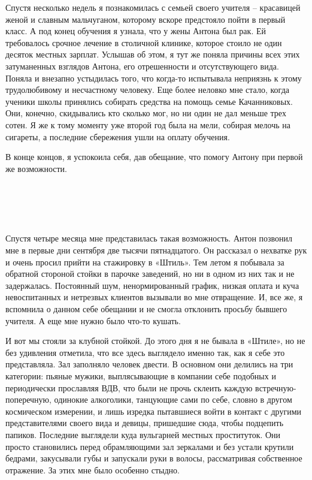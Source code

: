 \documentclass[
]{book}
\begin{document}
Спустя несколько недель я познакомилась с семьей своего учителя -- красавицей женой и славным мальчуганом, которому вскоре предстояло пойти в первый класс. А под конец обучения я узнала, что у жены Антона был рак. Ей требовалось срочное лечение в столичной клинике, которое стоило не один десяток местных зарплат. Услышав об этом, я тут же поняла причины всех этих затуманенных взглядов Антона, его отрешенности и отсутствующего вида. Поняла и внезапно устыдилась того, что когда-то испытывала неприязнь к этому трудолюбивому и несчастному человеку. Еще более неловко мне стало, когда ученики школы принялись собирать средства на помощь семье Качанниковых. Они, конечно, скидывались кто сколько мог, но ни один не дал меньше трех сотен. Я же к тому моменту уже второй год была на мели, собирая мелочь на сигареты, а последние сбережения ушли на оплату обучения.

В конце концов, я успокоила себя, дав обещание, что помогу Антону при первой же возможности.

\hypertarget{chapter-31}{%
\chapter{~}\label{chapter-31}}

Спустя четыре месяца мне представилась такая возможность. Антон позвонил мне в первые дни сентября две тысячи пятнадцатого. Он рассказал о нехватке рук и очень просил прийти на стажировку в «Штиль». Тем летом я побывала за обратной стороной стойки в парочке заведений, но ни в одном из них так и не задержалась. Постоянный шум, ненормированный график, низкая оплата и куча невоспитанных и нетрезвых клиентов вызывали во мне отвращение. И, все же, я вспомнила о данном себе обещании и не смогла отклонить просьбу бывшего учителя. А еще мне нужно было что-то кушать.

И вот мы стояли за клубной стойкой. До этого дня я не бывала в «Штиле», но не без удивления отметила, что все здесь выглядело именно так, как я себе это представляла. Зал заполняло человек двести. В основном они делились на три категории: пьяные мужики, выплясывающие в компании себе подобных и периодически прославляя ВДВ, что были не прочь склеить каждую встречную-поперечную, одинокие алкоголики, танцующие сами по себе, словно в другом космическом измерении, и лишь изредка пытавшиеся войти в контакт с другими представителями своего вида и девицы, пришедшие сюда, чтобы подцепить папиков. Последние выглядели куда вульгарней местных проституток. Они просто становились перед обрамляющими зал зеркалами и без устали крутили бедрами, закусывали губы и запускали руки в волосы, рассматривая собственное отражение. За этих мне было особенно стыдно.
\end{document}
